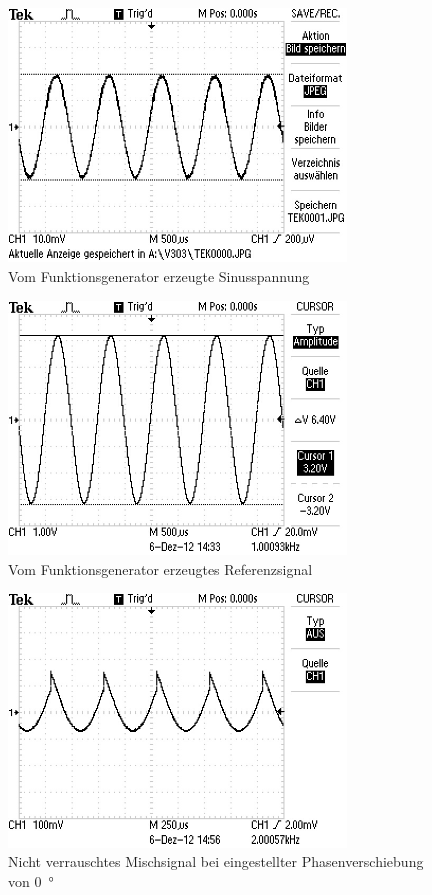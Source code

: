 \begin{figure}
  \centering
  \includegraphics[width=0.8\textwidth]{aufnahmen/eingangssignal.jpg}
  \caption{Vom Funktionsgenerator erzeugte Sinusspannung}
  \label{fig:anfangssignal_ohne_rausch}
\end{figure}

\begin{figure}
  \centering
  \includegraphics[width=0.8\textwidth]{aufnahmen/referenzsignal.jpg}
  \caption{Vom Funktionsgenerator erzeugtes Referenzsignal}
  \label{fig:referenzsignal_ohne_rausch}
\end{figure}


\begin{figure}
  \centering
  \includegraphics[width=0.8\textwidth]{aufnahmen/phase_0_ohne_rauschen.jpg}
  \caption{Nicht verrauschtes Mischsignal bei eingestellter
    Phasenverschiebung von \SI{0}{\degree}}
    \label{fig:phase_0_nicht_verrauscht}
\end{figure}


